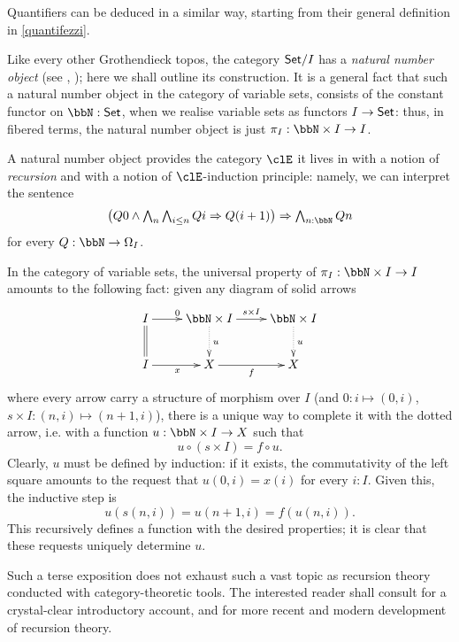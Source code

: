 Quantifiers can be deduced in a similar way, starting from their general definition in \autoref{quantifezzi}.
\begin{remark}
	Like every other Grothendieck topos, the category $\mathsf{Set}/I$ has a \emph{natural number object} (see \cite[VI.1]{mac1992sheaves}, \cite[p.46]{lambek1988introduction}); here we shall outline its construction. It is a general fact that such a natural number object in the category of variable sets, consists of the constant functor on $\bbN : \Set$, when we realise variable sets as functors $I \to \mathsf{Set}$: thus, in fibered terms, the natural number object is just $\pi_I : \bbN \times I \to I$.

	A natural number object provides the category $\clE$ it lives in with a notion of \emph{recursion} and with a notion of $\clE$-induction principle: namely, we can interpret the sentence
	\[\textstyle\big(Q0\land \bigwedge_n\bigwedge_{i\le n} Qi\Rightarrow Q(i+1)\big)\Rightarrow \bigwedge_{n : \bbN} Qn\]
	for every $Q : \bbN \to \Omega_I$.

	In the category of variable sets, the universal property of $\pi_I : \bbN\times I \to I$ amounts to the following fact: given any diagram of solid arrows
	\begin{equation}\label{natnumeq}
		\vcenter{\xymatrix{
				I \ar[r]^0 \ar@{=}[d] & \bbN\times I\ar@{.>}[d]^u \ar[r]^{s\times I} & \bbN \times I\ar@{.>}[d]^u \\
				I \ar[r]_x & X \ar[r]_f & X
			}}
	\end{equation}
	where every arrow carry a structure of morphism over $I$ (and $0 : i \mapsto (0,i)$, $s\times I : (n,i) \mapsto (n+1,i)$), there is a unique way to complete it with the dotted arrow, i.e. with a function $u : \bbN \times I \to X$ such that
	\[u \circ (s\times I) = f \circ u.\]
	Clearly, $u$ must be defined by induction: if it exists, the commutativity of the left square amounts to the request that $u(0,i)=x(i)$ for every $i : I$. Given this, the inductive step is
	\[
		u(s(n,i)) = u(n+1,i) = f(u(n,i)).
	\]
	This recursively defines a function with the desired properties; it is clear that these requests uniquely determine $u$.
\end{remark}
Such a terse exposition does not exhaust such a vast topic as recursion theory conducted with category-theoretic tools. The interested reader shall consult \cite{jacobs1997tutorial} for a crystal-clear introductory account, and \cite{cockett2008introduction,cockett2014total} for more recent and modern development of recursion theory.
